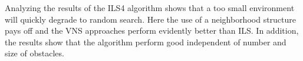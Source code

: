 %      
%       
%       
%               
%       
%       
%           
%       
%       
%      
   
Analyzing the results of the ILS4 algorithm shows that a too small environment will quickly degrade to random search. 
Here the use of a neighborhood structure pays off and the VNS approaches perform evidently better than ILS. 
In addition, the results show that the algorithm perform good independent of number and size of obstacles.

